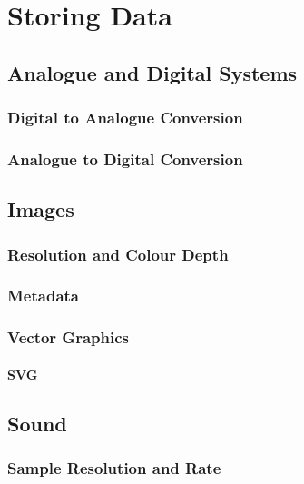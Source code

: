 \chapter{Storing Data}
	

	
	\section{Analogue and Digital Systems}
	
		\subsection{Digital to Analogue Conversion}
		
		\subsection{Analogue to Digital Conversion}
		
	\section{Images}
		
		\subsection{Resolution and Colour Depth}
		
		\subsection{Metadata}
		
		\subsection{Vector Graphics}
			
			\subsubsection{SVG}
			
	\section{Sound}
		
		\subsection{Sample Resolution and Rate}
		

